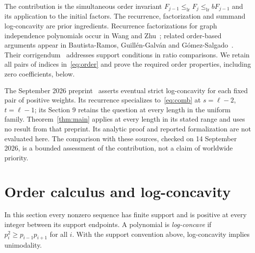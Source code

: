 \documentclass[11pt]{article}
\newcommand{\lr}{\mathrel{\leq_{\mathrm{lr}}}}
\begin{document}
The contribution is the simultaneous order invariant
$F_{j-1}\lr F_j\lr bF_{j-1}$ and its application to the initial factors.
The recurrence, factorization and summand log-concavity are prior ingredients.
Recurrence factorizations for graph independence polynomials occur in
Wang and Zhu~\cite[Theorem 3.1]{WZ}; related order-based arguments appear
in Bautista-Ramos, Guill\'en-Galv\'an and G\'omez-Salgado~\cite{BGG}.
Their corrigendum~\cite{BGGcorr} addresses support conditions in ratio
comparisons. We retain all pairs of indices in~\eqref{eq:order} and prove
the required order properties, including zero coefficients, below.

The September 2026 preprint~\cite[Theorem 1 and Corollary 2]{Eventual}
asserts eventual strict log-concavity for each fixed pair of positive
weights. Its recurrence specializes to~\eqref{eq:comb} at
$s=\ell-2$, $t=\ell-1$; its Section 9 retains the question at every
length in the uniform family. Theorem~\ref{thm:main} applies at every
length in its stated range and uses no result from that preprint.
Its analytic proof and reported formalization are not evaluated here.
The comparison with these sources, checked on 14 September 2026, is a
bounded assessment of the contribution, not a claim of worldwide priority.

\section{Order calculus and log-concavity}

In this section every nonzero sequence has finite support and is positive
at every integer between its support endpoints. A polynomial is
\emph{log-concave} if $p_i^2\geq p_{i-1}p_{i+1}$ for all $i$.
With the support convention above, log-concavity implies unimodality.
\end{document}
